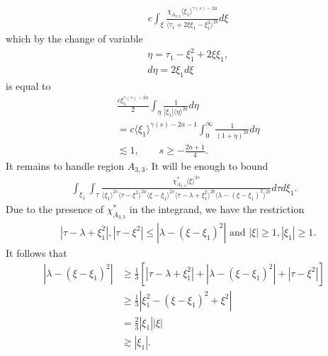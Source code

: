 \documentclass[12pt,reqno]{amsart}
\numberwithin{equation}{section}  %
\begin{document}
\begin{equation*}
\begin{split}
  &  c
  \int_{\xi} \frac{\chi_{A_{3,2}} \langle \xi_{1} \rangle ^{\gamma(s) -2a}}{\langle
  \tau_{1} + 2 \xi \xi_{1} - \xi_{1}^{2} \rangle^{2b} } d \xi
\end{split}
\end{equation*}
which by the change of variable
%
%
\begin{equation*}
\begin{split}
  & \eta = \tau_{1} - \xi_{1}^{2} + 2 \xi \xi_{1},
  \\
  & d \eta = 2 \xi_{1} d \xi
\end{split}
\end{equation*}
%
%
is equal to
%
%
\begin{equation*}
\begin{split}
  & \frac{c \xi_{1}^{\gamma(s) -2a}}{2}  \int_{\eta} 
  \frac{1}{| \xi_{1} |\langle \eta \rangle ^{2a} }d \eta
  \\
  & = c\langle \xi_{1} \rangle ^{\gamma(s) -2a -1} \int_{0}^{\infty} \frac{1}{(1 + \eta
  )^{2a}}d \eta
  \\
  & \lesssim 1, \qquad s \ge -\frac{2a+1}{4}.
\end{split}
\end{equation*}
It remains to handle region $A_{3,3}$. It will be enough to bound
%
%
\begin{equation}
  \label{region-A-2-3-star-split}
\begin{split}
   \int_{\xi_{1}} \int_{\tau} \frac{\chi^{*}_{A_{3,3}}
    \langle \xi \rangle ^{2s}
    }{ \langle \xi_{1} \rangle^{2s} \langle  \tau  - \xi^{2}
    \rangle ^{2a}  \langle
\xi-\xi_{1} \rangle ^{2s}  \langle  \tau - \lambda+\xi_{1}^{2}
\rangle^{2b} \langle   \lambda  -(\xi - \xi_{1})^{2}
\rangle^{2b} } d \tau d \xi_{1}.
\end{split}
\end{equation}
%
Due to the presence of $\chi^{*}_{A_{3,3}}$ in the integrand, we have the restriction
%
%
\begin{equation*}
\begin{split}
& |\tau - \lambda +\xi_{1}^2|, | \tau - \xi^{2} | \le |  \lambda -
(\xi - \xi_{1})^{2} | \text{ and }  |\xi| \ge 1, |\xi_1| \ge 1.
\end{split}
\end{equation*}
%
It follows that
\begin{equation}
  \label{smoothing-2-3-case-6}
\begin{split}
  | \lambda - (\xi - \xi_{1})^{2} |
  & \ge \frac{1}{3}\left[ | \tau - \lambda + \xi_{1}^{2} | + | \lambda - (\xi - \xi_{1})^{2}
  | + | \tau - \xi^{2} | \right]
  \\
  & \ge \frac{1}{3} |  \xi_{1}^{2} - (\xi - \xi_{1})^{2} + \xi^{2} |
  \\
  & = \frac{2}{3} | \xi_{1} | | \xi |
  \\
  & \gtrsim | \xi_{1} |.
\end{split}
\end{equation}
\end{document}
